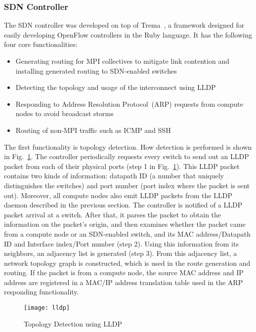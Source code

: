\subsubsection{SDN Controller}

The SDN controller was developed on top  of Trema~\autocite{trema}, a
framework designed for easily developing OpenFlow controllers in the Ruby
language. It has the following four core functionalities:

\begin{itemize}
\item Generating routing for MPI collectives to mitigate link contention and
    installing generated routing to SDN-enabled switches
\item Detecting the topology and usage of the interconnect using LLDP
\item Responding to Address Resolution Protocol~(ARP) requests from compute
    nodes to avoid broadcast storms
\item Routing of non-MPI traffic such as ICMP and SSH
\end{itemize}

The first functionality is topology detection. How detection is
performed is shown in Fig.~\ref{fig:lldp}. The controller periodically
requests every switch to send out an LLDP packet from each of their physical
ports (step 1 in Fig.~\ref{fig:lldp}). This LLDP packet contains two kinds of
information: datapath ID (a number that uniquely distinguishes the switches)
and port number (port index where the packet is sent out). Moreover, all
compute nodes also emit LLDP packets from the LLDP daemon described in the
previous section. The controller is notified of a LLDP packet arrival at a
switch. After that, it parses the packet to obtain the information on the
packet's origin, and then examines whether the packet came from a compute node
or an SDN-enabled switch, and its MAC address/Datapath ID and Interface
index/Port number (step 2). Using this information from its neighbors, an
adjacency list is generated (step 3). From this adjacency list, a network
topology graph is constructed, which is used in the route generation and
routing. If the packet is from a compute node, the source MAC address and IP
address are registered in a MAC/IP address translation table used in the ARP
responding functionality.

\begin{figure}
    \centering
    \texttt{[image: lldp]}
    \caption{Topology Detection using LLDP}%
    \label{fig:lldp}
\end{figure}

